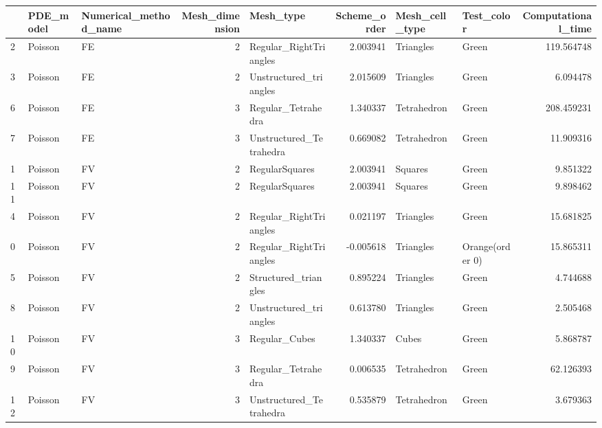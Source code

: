 \begin{tabular}{lllrlrllr}
\toprule
{} & PDE\_model & Numerical\_method\_name &  Mesh\_dimension &                Mesh\_type &  Scheme\_order & Mesh\_cell\_type &       Test\_color &  Computational\_time \\
\midrule
2  &   Poisson &                    FE &               2 &   Regular\_RightTriangles &      2.003941 &      Triangles &            Green &          119.564748 \\
3  &   Poisson &                    FE &               2 &   Unstructured\_triangles &      2.015609 &      Triangles &            Green &            6.094478 \\
6  &   Poisson &                    FE &               3 &       Regular\_Tetrahedra &      1.340337 &    Tetrahedron &            Green &          208.459231 \\
7  &   Poisson &                    FE &               3 &  Unstructured\_Tetrahedra &      0.669082 &    Tetrahedron &            Green &           11.909316 \\
1  &   Poisson &                    FV &               2 &           RegularSquares &      2.003941 &        Squares &            Green &            9.851322 \\
11 &   Poisson &                    FV &               2 &           RegularSquares &      2.003941 &        Squares &            Green &            9.898462 \\
4  &   Poisson &                    FV &               2 &   Regular\_RightTriangles &      0.021197 &      Triangles &            Green &           15.681825 \\
0  &   Poisson &                    FV &               2 &   Regular\_RightTriangles &     -0.005618 &      Triangles &  Orange(order 0) &           15.865311 \\
5  &   Poisson &                    FV &               2 &     Structured\_triangles &      0.895224 &      Triangles &            Green &            4.744688 \\
8  &   Poisson &                    FV &               2 &   Unstructured\_triangles &      0.613780 &      Triangles &            Green &            2.505468 \\
10 &   Poisson &                    FV &               3 &            Regular\_Cubes &      1.340337 &          Cubes &            Green &            5.868787 \\
9  &   Poisson &                    FV &               3 &       Regular\_Tetrahedra &      0.006535 &    Tetrahedron &            Green &           62.126393 \\
12 &   Poisson &                    FV &               3 &  Unstructured\_Tetrahedra &      0.535879 &    Tetrahedron &            Green &            3.679363 \\
\bottomrule
\end{tabular}
